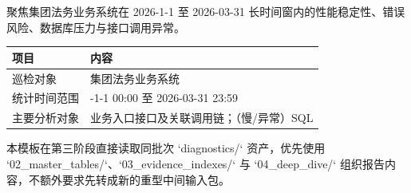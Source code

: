 
聚焦集团法务业务系统在 2026-1-1 至 2026-03-31 长时间窗内的性能稳定性、错误风险、数据库压力与接口调用异常。\par


\begin{center}
\setlength{\tabcolsep}{4pt}
\renewcommand{\arraystretch}{1.6}
\begin{tabular}{>{\RaggedRight\arraybackslash}p{}>{\RaggedRight\arraybackslash}p{}}
\hline
\cellcolor{HeaderBlue}\color{white}\bfseries 项目 & \cellcolor{HeaderBlue}\color{white}\bfseries 内容 \\
\hline
巡检对象 & 集团法务业务系统 \\
\hline
统计时间范围 & 2026-\hspace{0pt}1-\hspace{0pt}1 00:\hspace{0pt}00 至 2026-\hspace{0pt}03-\hspace{0pt}31 23:\hspace{0pt}59 \\
\hline
主要分析对象 & 业务入口接口及关联调用链；（慢/\hspace{0pt}异常）SQL \\
\hline
\end{tabular}
\end{center}

\vspace{0.4em}


本模板在第三阶段直接读取同批次 `diagnostics/` 资产，优先使用 `02_master_tables/`、`03_evidence_indexes/` 与 `04_deep_dive/` 组织报告内容，不额外要求先转成新的重型中间输入包。\par

\vspace{0.4em}

